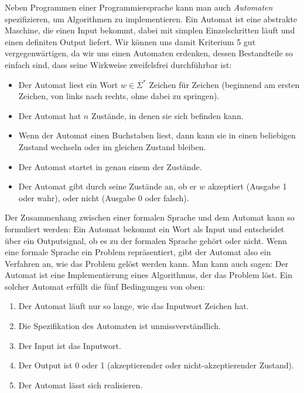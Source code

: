 Neben Programmen einer Programmiersprache kann man auch
\emph{Automaten} spezifizieren,
um Algorithmen zu implementieren.
Ein Automat ist eine abstrakte Maschine,
die einen Input bekommt, 
dabei mit simplen Einzelschritten läuft
und einen definiten Output liefert.
Wir können uns damit Kriterium 5 gut vergegenwärtigen,
da wir uns einen Automaten erdenken,
dessen Bestandteile so einfach sind,
dass seine Wirkweise zweifelsfrei durchführbar ist:

\begin{itemize}
    \item Der Automat liest ein Wort $w \in \Sigma^*$ Zeichen für Zeichen
        (beginnend am ersten Zeichen, von links nach rechts, ohne dabei zu springen).
    \item Der Automat hat $n$ Zustände, in denen sie sich befinden kann.
    \item Wenn der Automat einen Buchstaben liest,
        dann kann sie in einen beliebigen Zustand wechseln oder im gleichen Zustand bleiben.
    \item Der Automat startet in genau einem der Zustände.
    \item Der Automat gibt durch seine Zustände an,
        ob er $w$ akzeptiert (Ausgabe 1 oder wahr),
        oder nicht (Ausgabe 0 oder falsch).
\end{itemize}

Der Zusammenhang zwischen einer formalen Sprache und dem Automat kann so formuliert werden:
Ein Automat bekommt ein Wort als Input und entscheidet über ein Outputsignal,
ob es zu der formalen Sprache gehört oder nicht.
Wenn eine formale Sprache ein Problem repräsentiert,
gibt der Automat also ein Verfahren an, 
wie das Problem gelöst werden kann.
Man kann auch sagen:
Der Automat ist eine Implementierung eines Algorithmus,
der das Problem löst.
Ein solcher Automat erfüllt die fünf Bedingungen von oben:
\begin{enumerate}
    \item Der Automat läuft nur so lange, wie das Inputwort Zeichen hat.
    \item Die Spezifikation des Automaten ist unmissverständlich.  
    \item Der Input ist das Inputwort.
    \item Der Output ist 0 oder 1 (akzeptierender oder nicht-akzeptierender Zustand).
    \item Der Automat lässt sich realisieren. 
\end{enumerate}

